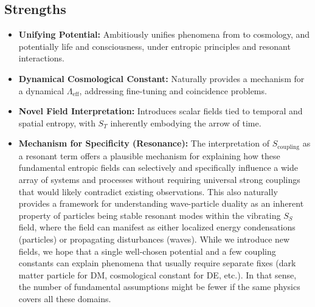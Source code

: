 \documentclass[11pt,a4paper]{article} %
\newcommand{\ST}{S_T}
\newcommand{\SSp}{S_S} %
\newcommand{\Scoupling}{S_{\text{coupling}}}
\newcommand{\QGP}{\text{quark-gluon plasma}} %
\newcommand{\Lambdaeff}{\Lambda_{\text{eff}}}
\begin{document}
\subsection{Strengths}
\begin{itemize}
    \item \textbf{Unifying Potential:} Ambitiously unifies phenomena from \QGP{} to cosmology, and potentially life and consciousness, under entropic principles and resonant interactions.
    \item \textbf{Dynamical Cosmological Constant:} Naturally provides a mechanism for a dynamical $\Lambdaeff$, addressing fine-tuning and coincidence problems.
    \item \textbf{Novel Field Interpretation:} Introduces scalar fields tied to temporal and spatial entropy, with $\ST$ inherently embodying the arrow of time.
    \item \textbf{Mechanism for Specificity (Resonance):} The interpretation of $\Scoupling$ as a resonant term offers a plausible mechanism for explaining how these fundamental entropic fields can selectively and specifically influence a wide array of systems and processes without requiring universal strong couplings that would likely contradict existing observations. This also naturally provides a framework for understanding wave-particle duality as an inherent property of particles being stable resonant modes within the vibrating $\SSp$ field, where the field can manifest as either localized energy condensations (particles) or propagating disturbances (waves). While we introduce new fields, we hope that a single well-chosen potential and a few coupling constants can explain phenomena that usually require separate fixes (dark matter particle for DM, cosmological constant for DE, etc.). In that sense, the number of fundamental assumptions might be fewer if the same physics covers all these domains.
\end{itemize}
\end{document}
